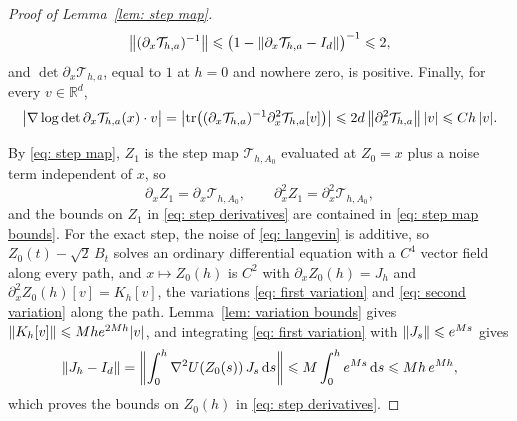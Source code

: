 \documentclass[namedate,webpdf,imanum]{ima-authoring-template}
\newcommand{\Le}{\leqslant}
\newcommand{\D}{\mathrm{d}}
\theoremstyle{thmstyletwo}
\numberwithin{equation}{section}
\begin{document}
\begin{proof}[Proof of Lemma~\ref{lem: step map}]
\begin{equation*}
        \bigl\| ( \partial_x \mathcal T_{h,a} )^{-1} \bigr\| \Le \bigl( 1 - \norm{\partial_x \mathcal T_{h,a} - I_d} \bigr)^{-1} \Le 2 ,
    \end{equation*}
    and $\det \partial_x \mathcal T_{h,a}$, equal to $1$ at $h = 0$ and nowhere zero, is positive. Finally, for every $v \in \mathbb R^d$,
    \begin{equation*}
        \bigl| \nabla \log\det \partial_x \mathcal T_{h,a}(x) \cdot v \bigr|
        = \bigl| \operatorname{tr}\bigl( ( \partial_x \mathcal T_{h,a} )^{-1} \partial_x^2 \mathcal T_{h,a}[v] \bigr) \bigr|
        \Le 2 d\, \norm{\partial_x^2 \mathcal T_{h,a}}\, |v| \Le C h\, |v| .
    \end{equation*}

    By \eqref{eq: step map}, $Z_1$ is the step map $\mathcal T_{h,A_0}$ evaluated at $Z_0 = x$ plus a noise term independent of $x$, so
    \begin{equation*}
        \partial_x Z_1 = \partial_x \mathcal T_{h,A_0} , \qquad \partial_x^2 Z_1 = \partial_x^2 \mathcal T_{h,A_0} ,
    \end{equation*}
    and the bounds on $Z_1$ in \eqref{eq: step derivatives} are contained in \eqref{eq: step map bounds}. For the exact step, the noise of \eqref{eq: langevin} is additive, so $Z_0(t) - \sqrt2\, B_t$ solves an ordinary differential equation with a $C^4$ vector field along every path, and $x \mapsto Z_0(h)$ is $C^2$ with $\partial_x Z_0(h) = J_h$ and $\partial_x^2 Z_0(h)[v] = K_h[v]$, the variations \eqref{eq: first variation} and \eqref{eq: second variation} along the path. Lemma~\ref{lem: variation bounds} gives $\norm{K_h[v]} \Le M h e^{2Mh} |v|$, and integrating \eqref{eq: first variation} with $\norm{J_s} \Le e^{Ms}$ gives
    \begin{equation*}
        \norm{J_h - I_d} = \biggl\| \int_0^h \nabla^2 U(Z_0(s))\, J_s\,\D s \biggr\| \Le M \int_0^h e^{Ms}\,\D s \Le M h\, e^{Mh} ,
    \end{equation*}
    which proves the bounds on $Z_0(h)$ in \eqref{eq: step derivatives}.


\end{proof}
\end{document}
